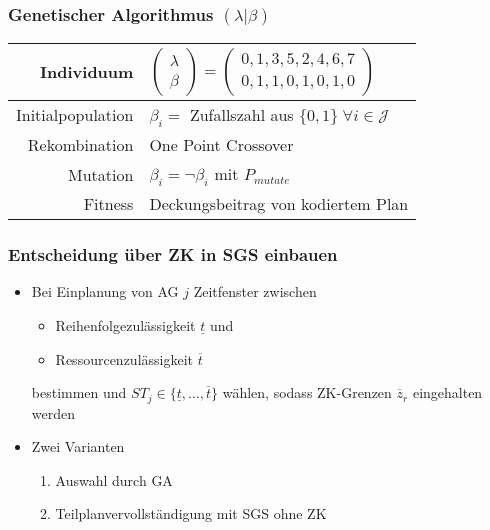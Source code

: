 \begin{frame}[noframenumbering]
	\frametitle{Genetischer Algorithmus $(\lambda|\beta)$}
	\begin{small}
		\begin{center}
			\begin{tabular}{rl}
				\hline 
				Individuum & $\begin{pmatrix}\lambda\\\beta\end{pmatrix}=\begin{pmatrix}0,1,3,5,2,4,6,7\\0,1,1,0,1,0,1,0\end{pmatrix}$\parbox[c][40pt][c]{0pt}{}\tabularnewline
				\hline 
				Initialpopulation & $\beta_i=$ Zufallszahl aus $\{0,1\} \; \forall i \in \mathcal{J}$\tabularnewline
				\hline 
				Rekombination & One Point Crossover\tabularnewline
				\hline 
				Mutation & $\beta_i=\neg \beta_i$ mit $P_{mutate}$\tabularnewline
				\hline 
				Fitness & Deckungsbeitrag von kodiertem Plan\tabularnewline
				\hline 
			\end{tabular}
		\end{center}
	\end{small}
\end{frame}


\begin{frame}[noframenumbering]
	\frametitle{Entscheidung über ZK in SGS einbauen}
	\begin{itemize}
		\item Bei Einplanung von AG $j$ Zeitfenster zwischen
		\begin{itemize}
			\item Reihenfolgezulässigkeit $\underline{t}$ und
			\item Ressourcenzulässigkeit $\overline{t}$
		\end{itemize}
		bestimmen und $ST_j \in \{ \underline{t}, \ldots, \overline{t} \}$ wählen, sodass ZK-Grenzen $\overline{z}_r$ eingehalten werden\\[8mm]
		\item Zwei Varianten
		\begin{enumerate}
			\item Auswahl durch GA 
			\item Teilplanvervollständigung mit SGS ohne ZK
		\end{enumerate}
	\end{itemize}
\end{frame}

